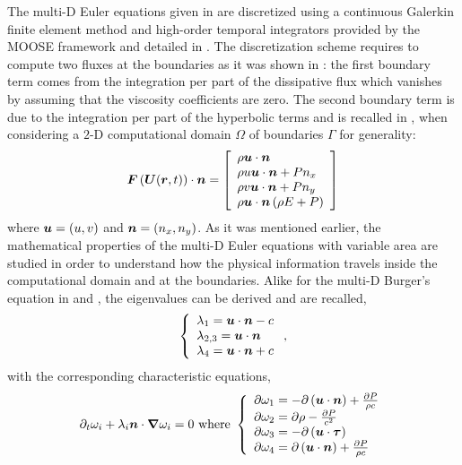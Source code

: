 The multi-D Euler equations given in  are discretized using a continuous Galerkin finite element method and high-order temporal integrators provided by the MOOSE framework and detailed in . The discretization scheme requires to compute two fluxes at the boundaries as it was shown in : the first boundary term comes from the integration per part of the dissipative flux which vanishes by assuming that the viscosity coefficients are zero. The second boundary term is due to the integration per part of the hyperbolic terms and is recalled in , when considering a $2$-D computational domain $\Omega$ of boundaries $\Gamma$ for generality:
%
\begin{equation}\label{eq:hyp_flux_bc_sct3}
\boldsymbol F \left( \boldsymbol U(\boldsymbol r, t) \right) \cdot \boldsymbol n = 
\left[ 
\begin{array}{l}
\rho \boldsymbol u \cdot \boldsymbol n\\
\rho u \boldsymbol u \cdot \boldsymbol n + P n_x \\
\rho v \boldsymbol u \cdot \boldsymbol n + P n_y \\
\rho \boldsymbol u \cdot \boldsymbol n \left( \rho E + P \right) 
\end{array}
\right]
\end{equation}
%
where $\boldsymbol u = \left( u , v \right)$ and $\boldsymbol n = \left( n_x, n _y \right)$. As it was mentioned earlier, the mathematical properties of the multi-D Euler equations with variable area are studied in order to understand how the physical information travels inside the computational domain and at the boundaries. Alike for the multi-D Burger's equation in  and , the eigenvalues can be derived \cite{Toro} and are recalled,
%
\begin{equation}\label{eq:eig_euler_2d_sct3}
\left\{
\begin{array}{l}
\lambda_1 = \boldsymbol u \cdot \boldsymbol n - c \\
\lambda_{2,3} = \boldsymbol u \cdot \boldsymbol n \\
\lambda_4 = \boldsymbol u \cdot \boldsymbol n + c \\
\end{array}
\right. ,
\end{equation}
%
with the corresponding characteristic equations,
%
\begin{equation}\label{eq:charac_euler_sct3}
\partial_t \omega_i + \lambda_i \boldsymbol n \cdot  \boldsymbol{\nabla} \omega_i = 0 \text{ where } 
\left\{
\begin{array}{l}
\partial \omega_1 = -\partial \left( \boldsymbol u \cdot \boldsymbol n \right) + \frac{\partial P}{\rho c}\\
\partial \omega_2 = \partial \rho - \frac{\partial P}{c^2} \\
\partial \omega_3 = -\partial \left( \boldsymbol u \cdot \boldsymbol\tau \right)\\
\partial \omega_4 = \partial \left( \boldsymbol u \cdot \boldsymbol n \right) + \frac{\partial P}{\rho c}\\
\end{array}
\right. 
\end{equation}

